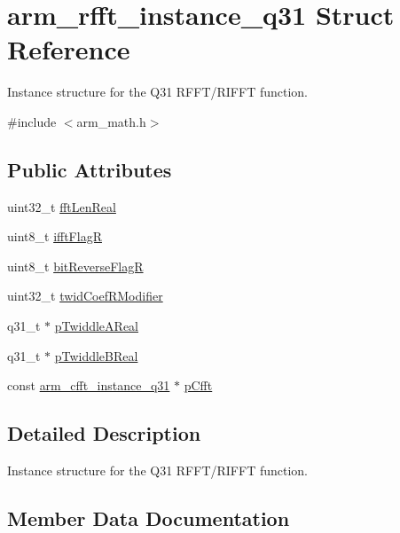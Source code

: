 \hypertarget{structarm__rfft__instance__q31}{}\section{arm\+\_\+rfft\+\_\+instance\+\_\+q31 Struct Reference}
\label{structarm__rfft__instance__q31}


Instance structure for the Q31 R\+F\+F\+T/\+R\+I\+F\+FT function.  




{\ttfamily \#include $<$arm\+\_\+math.\+h$>$}

\subsection*{Public Attributes}
\begin{DoxyCompactItemize}
\item 
uint32\+\_\+t \hyperlink{structarm__rfft__instance__q31_af777b0cadd5abaf064323692c2e6693b}{fft\+Len\+Real}
\item 
uint8\+\_\+t \hyperlink{structarm__rfft__instance__q31_af5c2615e6cde15524df38fa57ea32d94}{ifft\+FlagR}
\item 
uint8\+\_\+t \hyperlink{structarm__rfft__instance__q31_a3cb90cdc928a88b0203917dcb3dc1b71}{bit\+Reverse\+FlagR}
\item 
uint32\+\_\+t \hyperlink{structarm__rfft__instance__q31_a6fc90252b579f7c29e01bd279334fc43}{twid\+Coef\+R\+Modifier}
\item 
q31\+\_\+t $\ast$ \hyperlink{structarm__rfft__instance__q31_a2a0c944e66bab92fcbe19d1c29153250}{p\+Twiddle\+A\+Real}
\item 
q31\+\_\+t $\ast$ \hyperlink{structarm__rfft__instance__q31_ae5070be4c2e0327e618f5e1f4c5b9d80}{p\+Twiddle\+B\+Real}
\item 
const \hyperlink{structarm__cfft__instance__q31}{arm\+\_\+cfft\+\_\+instance\+\_\+q31} $\ast$ \hyperlink{structarm__rfft__instance__q31_a8fe10d425b59e096c23aa4bb5caa1974}{p\+Cfft}
\end{DoxyCompactItemize}


\subsection{Detailed Description}
Instance structure for the Q31 R\+F\+F\+T/\+R\+I\+F\+FT function. 

\subsection{Member Data Documentation}
